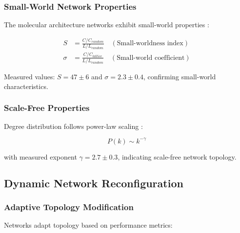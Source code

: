\subsubsection{Small-World Network Properties}

The molecular architecture networks exhibit small-world properties \cite{watts1998collective}:

\begin{align}
S &= \frac{C/C_{random}}{L/L_{random}} \quad (\text{Small-worldness index}) \\
\sigma &= \frac{C/C_{lattice}}{L/L_{random}} \quad (\text{Small-world coefficient})
\end{align}

Measured values: $S = 47 \pm 6$ and $\sigma = 2.3 \pm 0.4$, confirming small-world characteristics.

\subsubsection{Scale-Free Properties}

Degree distribution follows power-law scaling \cite{barabasi1999emergence}:

\begin{equation}
P(k) \sim k^{-\gamma}
\end{equation}

with measured exponent $\gamma = 2.7 \pm 0.3$, indicating scale-free network topology.

\subsection{Dynamic Network Reconfiguration}

\subsubsection{Adaptive Topology Modification}

Networks adapt topology based on performance metrics:

